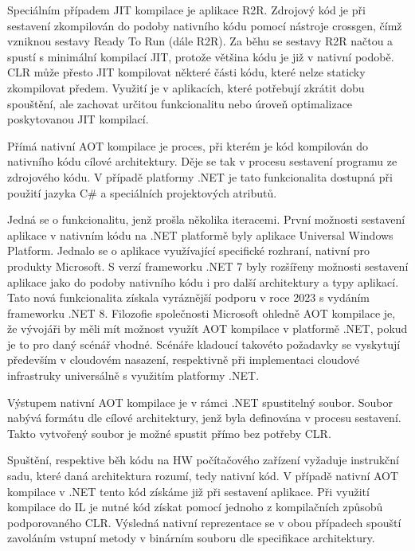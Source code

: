 Speciálním případem JIT kompilace je aplikace R2R. Zdrojový kód je při sestavení zkompilován do podoby nativního kódu pomocí nástroje crossgen, čímž vzniknou sestavy Ready To Run (dále R2R). Za běhu se sestavy R2R načtou a spustí s minimální kompilací JIT, protože většina kódu je již v nativní podobě. CLR může přesto JIT kompilovat některé části kódu, které nelze staticky zkompilovat předem. Využití je v aplikacích, které potřebují zkrátit dobu spouštění, ale zachovat určitou funkcionalitu nebo úroveň optimalizace poskytovanou JIT kompilací.


Přímá nativní AOT kompilace je proces, při kterém je kód kompilován do nativního kódu cílové architektury. Děje se tak v procesu sestavení programu ze zdrojového kódu. V případě platformy .NET je tato funkcionalita dostupná při použití jazyka C\# a speciálních projektových atributů. 

Jedná se o funkcionalitu, jenž prošla několika iteracemi. První možnosti sestavení aplikace v nativním kódu na .NET platformě byly aplikace Universal Windows Platform. Jednalo se o aplikace využívající specifické rozhraní, nativní pro produkty Microsoft. S verzí frameworku .NET 7 byly rozšířeny možnosti sestavení aplikace jako do podoby nativního kódu i pro další architektury a typy aplikací. Tato nová funkcionalita získala vyráznější podporu v roce 2023 s vydáním frameworku .NET 8. Filozofie společnosti Microsoft ohledně AOT kompilace je, že vývojáři by měli mít možnost využít AOT kompilace v platformě .NET, pokud je to pro daný scénář vhodné. Scénáře kladoucí takovéto požadavky se vyskytují především v cloudovém nasazení, respektivně při implementaci cloudové infrastruky universálně s využitím platformy .NET.

Výstupem nativní AOT kompilace je v rámci .NET spustitelný soubor. Soubor nabývá formátu dle cílové architektury, jenž byla definována v procesu sestavení. Takto vytvořený soubor je možné spustit přímo bez potřeby CLR. 


Spuštění, respektive běh kódu na HW počítačového zařízení vyžaduje instrukční sadu, které daná architektura rozumí, tedy nativní kód. V případě nativní AOT kompilace v .NET tento kód získáme již při sestavení aplikace. Při využití kompilace do IL je nutné kód získat pomocí jednoho z kompilačních způsobů podporovaného CLR. Výsledná nativní reprezentace se v obou případech spouští zavoláním vstupní metody v binárním souboru dle specifikace architektury.

